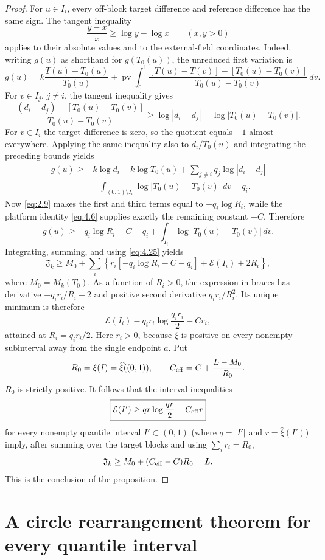 \documentclass[11pt]{article}
\numberwithin{equation}{section}
\theoremstyle{plain}
\theoremstyle{definition}
\theoremstyle{remark}
\newcommand{\1}{\mathbf 1}
\newcommand{\dd}{\,d}
\newcommand{\pv}{\operatorname {pv}}
\newcommand{\J}{\mathfrak J}
\newcommand{\E}{\mathcal E}
\begin{document}
\begin{proof}
For $u\in I_i$, every off-block target difference and reference
difference has the same sign.  The tangent inequality
\[
 \frac{y-x}{x}\ge\log y-\log x\qquad(x,y>0)
\]
applies to their absolute values and to the external-field coordinates.
Indeed, writing $g(u)$ as shorthand for $g(T_0(u))$, the unreduced first
variation is
\[
 g(u)=k\frac{T(u)-T_0(u)}{T_0(u)}
 +\pv\int_0^1
 \frac{[T(u)-T(v)]-[T_0(u)-T_0(v)]}
      {T_0(u)-T_0(v)}\dd v.
\]
For $v\in I_j$, $j\ne i$, the tangent inequality gives
\[
 \frac{(d_i-d_j)-[T_0(u)-T_0(v)]}{T_0(u)-T_0(v)}
 \ge\log|d_i-d_j|-\log|T_0(u)-T_0(v)|.
\]
For $v\in I_i$ the target difference is zero, so the quotient equals
$-1$ almost everywhere.  Applying the same inequality also to $d_i/T_0(u)$ and
integrating the preceding bounds yields
\begin{align*}
g(u)\ge{}&k\log d_i-k\log T_0(u)
 +\sum_{j\ne i}q_j\log|d_i-d_j|\\
&-\int_{(0,1)\setminus I_i}\log|T_0(u)-T_0(v)|\dd v-q_i.
\end{align*}
Now \eqref{eq:2.9} makes the first and third terms equal to
$-q_i\log R_i$, while the platform identity \eqref{eq:4.6} supplies exactly the
remaining constant $-C$.  Therefore
\[
 g(u)\ge-q_i\log R_i-C-q_i
 +\int_{I_i}\log|T_0(u)-T_0(v)|\dd v.
\]
Integrating, summing, and using \eqref{eq:4.25} yields
\[
 \J_k\ge M_0+\sum_i\left\{
 r_i[-q_i\log R_i-C-q_i]+\E(I_i)+2R_i\right\},
\]
where $M_0=M_k(T_0)$.  As a function of $R_i>0$, the expression in braces
has derivative $-q_ir_i/R_i+2$ and positive second derivative
$q_ir_i/R_i^2$.  Its unique minimum is therefore
\[
 \E(I_i)-q_ir_i\log\frac{q_ir_i}{2}-Cr_i,
\]
attained at $R_i=q_ir_i/2$.  Here $r_i>0$, because $\xi$ is positive on
every nonempty subinterval away from the single endpoint $a$.  Put
\[
 R_0=\xi(I)=\widehat\xi((0,1)),\qquad
 C_{\rm eff}=C+\frac{L-M_0}{R_0}.
\]
$R_0$ is strictly positive.  It follows that the interval inequalities
\begin{equation}
 \boxed{\E(I')\ge qr\log\frac{qr}{2}+C_{\rm eff}r}
\label{eq:4.32}
\end{equation}
for every nonempty quantile interval $I'\subset(0,1)$ (where
$q=|I'|$ and $r=\widehat\xi(I')$) imply, after summing over the target
blocks and using $\sum_i r_i=R_0$,
\[
 \J_k\ge M_0+(C_{\rm eff}-C)R_0=L.
\]
This is the conclusion of the proposition.
\end{proof}

\section{A circle rearrangement theorem for every quantile interval}
\label{sec:circle}
\end{document}
